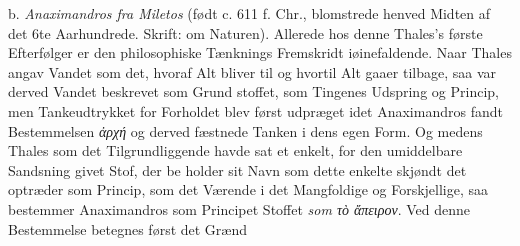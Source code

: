 \documentclass[12pt,a4paper]{book}
\newcommand{\gk}[1]{\textit{#1}}
\begin{document}
b. \emph{Anaximandros fra Miletos} (født c. 611 f. Chr.,
blomstrede henved Midten af det 6te Aarhundrede. Skrift: om
Naturen). Allerede hos denne Thales's første Efterfølger er
den philosophiske Tænknings Fremskridt iøinefaldende. Naar
Thales angav Vandet som det, hvoraf Alt bliver til og hvortil
Alt gaaer tilbage, saa var derved Vandet beskrevet som Grund\-%
stoffet, som Tingenes Udspring og Princip, men Tankeudtrykket
for Forholdet blev først udpræget idet Anaximandros fandt
Bestemmelsen \gk{ἀρχή} og derved fæstnede Tanken i dens egen
Form. Og medens Thales som det Tilgrundliggende havde sat
et enkelt, for den umiddelbare Sandsning givet Stof, der be\-%
holder sit Navn som dette enkelte skjøndt det optræder som
Princip, som det Værende i det Mangfoldige og Forskjellige,
saa bestemmer Anaximandros som Principet Stoffet \emph{som \gk{τὸ
ἄπειρον}}. Ved denne Bestemmelse betegnes først det Grænd\-%
\end{document}
